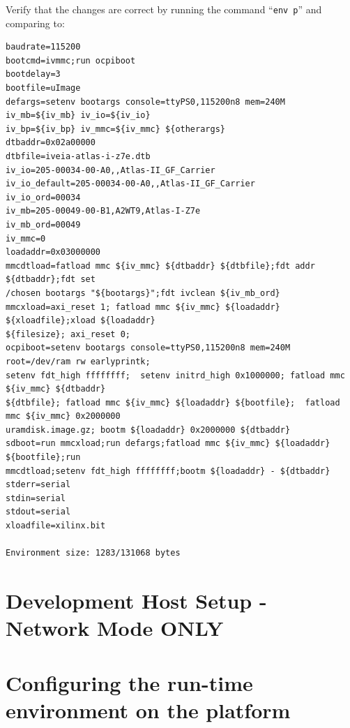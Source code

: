 \begin{flushleft}
Verify that the changes are correct by running the command ``\texttt{env p}'' and comparing to:
\end{flushleft}
\begin{verbatim}
baudrate=115200
bootcmd=ivmmc;run ocpiboot
bootdelay=3
bootfile=uImage
defargs=setenv bootargs console=ttyPS0,115200n8 mem=240M iv_mb=${iv_mb} iv_io=${iv_io}
iv_bp=${iv_bp} iv_mmc=${iv_mmc} ${otherargs}
dtbaddr=0x02a00000
dtbfile=iveia-atlas-i-z7e.dtb
iv_io=205-00034-00-A0,,Atlas-II_GF_Carrier
iv_io_default=205-00034-00-A0,,Atlas-II_GF_Carrier
iv_io_ord=00034
iv_mb=205-00049-00-B1,A2WT9,Atlas-I-Z7e
iv_mb_ord=00049
iv_mmc=0
loadaddr=0x03000000
mmcdtload=fatload mmc ${iv_mmc} ${dtbaddr} ${dtbfile};fdt addr ${dtbaddr};fdt set
/chosen bootargs "${bootargs}";fdt ivclean ${iv_mb_ord}
mmcxload=axi_reset 1; fatload mmc ${iv_mmc} ${loadaddr} ${xloadfile};xload ${loadaddr}
${filesize}; axi_reset 0;
ocpiboot=setenv bootargs console=ttyPS0,115200n8 mem=240M root=/dev/ram rw earlyprintk;
setenv fdt_high ffffffff;  setenv initrd_high 0x1000000; fatload mmc ${iv_mmc} ${dtbaddr}
${dtbfile}; fatload mmc ${iv_mmc} ${loadaddr} ${bootfile};  fatload mmc ${iv_mmc} 0x2000000
uramdisk.image.gz; bootm ${loadaddr} 0x2000000 ${dtbaddr}
sdboot=run mmcxload;run defargs;fatload mmc ${iv_mmc} ${loadaddr} ${bootfile};run
mmcdtload;setenv fdt_high ffffffff;bootm ${loadaddr} - ${dtbaddr}
stderr=serial
stdin=serial
stdout=serial
xloadfile=xilinx.bit

Environment size: 1283/131068 bytes
\end{verbatim}

\pagebreak
\section{Development Host Setup - Network Mode ONLY}

%

\pagebreak
\section{Configuring the run-time environment on the platform}

